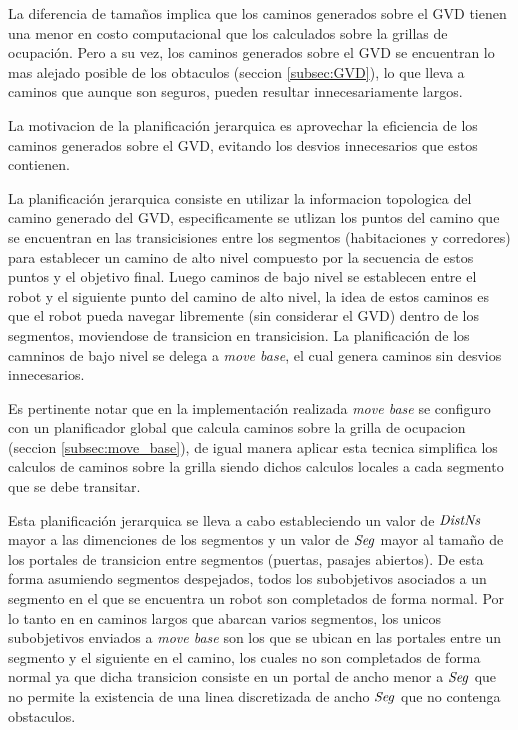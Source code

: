 La diferencia de tamaños implica que los caminos generados sobre el GVD tienen
una menor en costo computacional que los calculados sobre la grillas de
ocupación. Pero a su vez, los caminos generados sobre el GVD se encuentran lo
mas alejado posible de los obtaculos (seccion \ref{subsec:GVD}), lo que lleva a
caminos que aunque son seguros, pueden resultar innecesariamente largos.

La motivacion de la planificación jerarquica es aprovechar la eficiencia de los
caminos generados sobre el GVD, evitando los desvios innecesarios que estos
contienen.

La planificación jerarquica consiste en utilizar la informacion
topologica del camino generado del GVD, especificamente se utlizan los
puntos del camino que se encuentran en las transicisiones entre los
segmentos (habitaciones y corredores) para establecer un camino de alto
nivel compuesto por la secuencia de estos puntos y el objetivo final.
Luego caminos de bajo nivel se establecen entre el robot y el siguiente
punto del camino de alto nivel, la idea de estos caminos es que el robot
pueda navegar libremente (sin considerar el GVD) dentro de los
segmentos, moviendose de transicion en transicision. La planificación de
los camninos de bajo nivel se delega a \emph{move base}, el cual genera
caminos sin desvios innecesarios.

Es pertinente notar que en la implementación realizada \emph{move base} se
configuro con un planificador global que calcula caminos sobre la grilla de
ocupacion (seccion \ref{subsec:move_base}), de igual manera aplicar esta
tecnica simplifica los calculos de caminos sobre la grilla siendo dichos
calculos locales a cada segmento que se debe transitar.

Esta planificación jerarquica se lleva a cabo estableciendo un valor de
$\mathit{DistNs}$ mayor a las dimenciones de los segmentos y un valor de
$\mathit{Seg}$ mayor al tamaño de los portales de transicion entre
segmentos (puertas, pasajes abiertos). De esta forma asumiendo segmentos
despejados, todos los subobjetivos asociados a un segmento en el que se
encuentra un robot son completados de forma normal. Por lo tanto en en
caminos largos que abarcan varios segmentos, los unicos subobjetivos
enviados a \emph{move base} son los que se ubican en las portales entre
un segmento y el siguiente en el camino, los cuales no son completados
de forma normal ya que dicha transicion consiste en un portal de ancho
menor a $\mathit{Seg}$ que no permite la existencia de una linea
discretizada de ancho $\mathit{Seg}$ que no contenga obstaculos.

